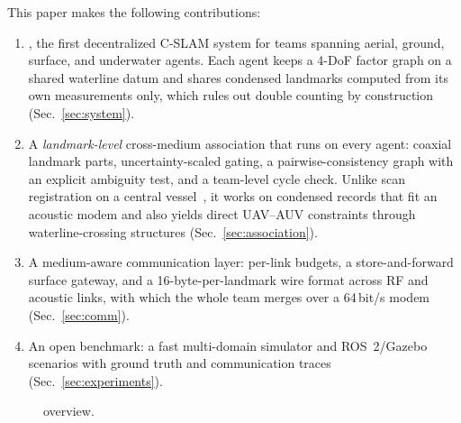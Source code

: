 \noindent This paper makes the following contributions:
\begin{enumerate}
  \item \avatar{}, the first decentralized C-SLAM system for teams spanning aerial, ground,
        surface, and underwater agents. Each agent keeps a 4-DoF factor graph on a shared
        waterline datum and shares condensed landmarks computed from its own measurements
        only, which rules out double counting by construction (Sec.~\ref{sec:system}).
  \item A \emph{landmark-level} cross-medium association that runs on every agent: coaxial
        landmark parts, uncertainty-scaled gating, a pairwise-consistency graph with an
        explicit ambiguity test, and a team-level cycle check. Unlike scan registration on a
        central vessel~\cite{mcconnell2026aboveandbelow}, it works on condensed records that
        fit an acoustic modem and also yields direct UAV--AUV constraints through
        waterline-crossing structures (Sec.~\ref{sec:association}).
  \item A medium-aware communication layer: per-link budgets, a store-and-forward surface
        gateway, and a 16-byte-per-landmark wire format across RF and acoustic links, with
        which the whole team merges over a 64\,bit/s modem (Sec.~\ref{sec:comm}).
  \item An open benchmark: a fast multi-domain simulator and ROS~2/Gazebo scenarios with
        ground truth and communication traces (Sec.~\ref{sec:experiments}).
\end{enumerate}

\begin{figure}[t]
  \centering
  \caption{\avatar{} overview. }
  \label{fig:teaser}
\end{figure}
